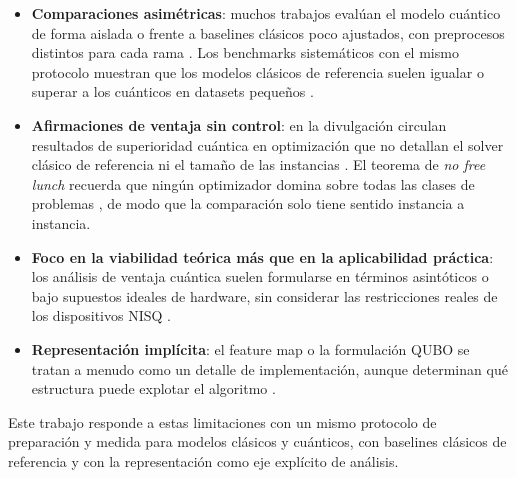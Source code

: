 \begin{itemize}
    \item \textbf{Comparaciones asimétricas}: muchos trabajos evalúan el modelo cuántico de forma aislada o frente a baselines clásicos poco ajustados, con preprocesos distintos para cada rama \citep{bowles2024}. Los benchmarks sistemáticos con el mismo protocolo muestran que los modelos clásicos de referencia suelen igualar o superar a los cuánticos en datasets pequeños \citep{bowles2024, qmlBenchmarks, wangClassicalVsQuantumMl}.

    \item \textbf{Afirmaciones de ventaja sin control}: en la divulgación circulan resultados de superioridad cuántica en optimización que no detallan el solver clásico de referencia ni el tamaño de las instancias \citep{vocalQuantumOutperform}. El teorema de \textit{no free lunch} recuerda que ningún optimizador domina sobre todas las clases de problemas \citep{wolpert1997}, de modo que la comparación solo tiene sentido instancia a instancia.

    \item \textbf{Foco en la viabilidad teórica más que en la aplicabilidad práctica}: los análisis de ventaja cuántica suelen formularse en términos asintóticos o bajo supuestos ideales de hardware, sin considerar las restricciones reales de los dispositivos NISQ \citep{preskill2018}.

    \item \textbf{Representación implícita}: el feature map o la formulación QUBO se tratan a menudo como un detalle de implementación, aunque determinan qué estructura puede explotar el algoritmo \citep{huang2021, lucas2014}.
\end{itemize}

Este trabajo responde a estas limitaciones con un mismo protocolo de preparación y medida para modelos clásicos y cuánticos, con baselines clásicos de referencia y con la representación como eje explícito de análisis.
